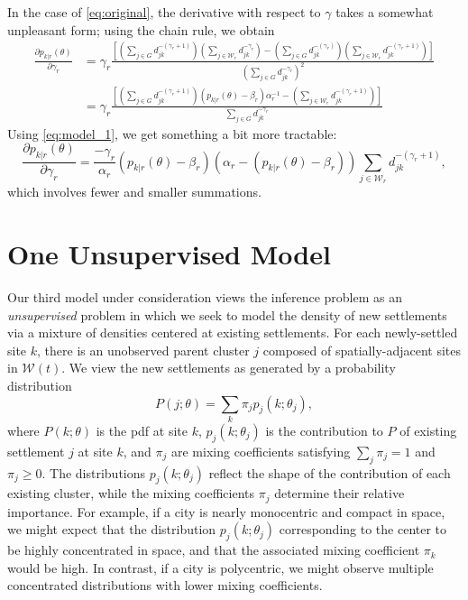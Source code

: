 \documentclass[english]{scrartcl}
\begin{document}
	In the case of \eqref{eq:original}, the derivative with respect to $\gamma$ takes a somewhat unpleasant form; using the chain rule, we obtain 
	\begin{align}
		\frac{\partial p_{k|r}(\theta)}{\partial \gamma_r} &= \gamma_r\frac{\left[ \left(\sum_{j \in G} d_{jk}^{-(\gamma_r + 1)}\right)\left( \sum_{j \in \mathcal{W}_r} d_{jk}^{-\gamma_r} \right) - \left(\sum_{j \in G} d_{jk}^{-(\gamma_r)}\right)\left( \sum_{j \in \mathcal{W}_r} d_{jk}^{-(\gamma_r + 1)} \right) \right]}{\left(\sum_{j \in G} d_{jk}^{-\gamma_r}\right)^2} \\ 
		&= \gamma_r \frac{\left[ \left(\sum_{j \in G} d_{jk}^{-(\gamma_r + 1)}\right)\left(p_{k|r}(\theta) - \beta_r \right) \alpha_r^{-1} - \left( \sum_{j \in \mathcal{W}_r} d_{jk}^{-(\gamma_r + 1)} \right) \right]}{\sum_{j \in G} d_{jk}^{-\gamma_r}}
	\end{align}
	Using \eqref{eq:model_1}, we get something a bit more tractable: 
	\begin{equation}
		\frac{\partial p_{k|r}(\theta)}{\partial \gamma_r} = \frac{-\gamma_r}{\alpha_r}\left(p_{k|r}(\theta) - \beta_r\right) \left(\alpha_r - (p_{k|r}(\theta) - \beta_r) \right) \sum_{j \in \mathcal{W}_r} d_{jk}^{-(\gamma_r + 1)}, 
	\end{equation}
	which involves fewer and smaller summations. 

\section{One Unsupervised Model}

	Our third model under consideration views the inference problem as an \emph{unsupervised} problem in which we seek to model the density of new settlements via a mixture of densities centered at existing settlements. 
	For each newly-settled site $k$, there is an unobserved parent cluster $j$ composed of spatially-adjacent sites in $\mathcal{W}(t)$.
	We view the new settlements as generated by a probability distribution 
	\begin{equation}
		P(j; \theta) = \sum_{k} \pi_j p_j(k;\theta_j),
	\end{equation}
	where $P(k;\theta)$ is the pdf at site $k$, $p_j(k; \theta_j)$ is the contribution to $P$ of existing settlement $j$ at site $k$, and $\pi_j$ are mixing coefficients satisfying $\sum_j \pi_j = 1$ and $\pi_j \geq 0$.  
	The distributions $p_j(k; \theta_j)$ reflect the shape of the contribution of each existing cluster, while the mixing coefficients $\pi_j$ determine their relative importance. 
	For example, if a city is nearly monocentric and compact in space, we might expect that the distribution $p_j(k; \theta_j)$ corresponding to the center to be highly concentrated in space, and that the associated mixing coefficient $\pi_k$ would be high. 
	In contrast, if a city is polycentric, we might observe multiple concentrated distributions with lower mixing coefficients. 
\end{document}
